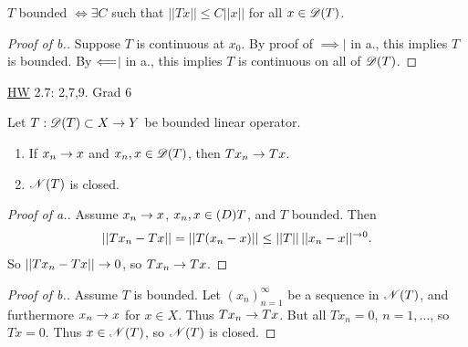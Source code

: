 \documentclass[]{article}
\begin{document}
\begin{recall}
	$T$ bounded $\iff \exists C$ such that $||Tx||\leq C||x||$ for all $x\in\mathscr{D}(T)$.
\end{recall}
\begin{proof}
	[Proof of b.] Suppose $T$ is continuous at $x_0$. By proof of \ul{$\implies$}$\mid$ in a., this implies $T$ is bounded.
	By \ul{$\Longleftarrow$}$\mid$ in a., this implies $T$ is continuous on all of $\mathscr{D}(T)$.
\end{proof}
\ul{HW} 2.7: 2,7,9. Grad 6 
\begin{corollary}
	Let $T:\mathscr{D}(T)\subset X\rightarrow Y$ be bounded linear operator.
	\begin{enumerate}
		\item[a.] If $x_n\rightarrow x$ and $x_n,x\in\mathscr{D}(T)$, then $Tx_n\rightarrow Tx$.
		\item[b.] $\mathscr{N}(T)$ is closed.
	\end{enumerate}
\end{corollary}
\begin{proof}
	[Proof of a.] Assume $x_n\rightarrow x$, $x_n,x\in\mathscr{(}D)T$, and $T$ bounded. Then
	\begin{align*}
		||Tx_n-Tx|| = ||T(x_n-x)||
					\leq ||T||\,||x_n-x||^{\rightarrow0}.
	\end{align*}
	So $||Tx_n-Tx||\rightarrow0$, so $Tx_n\rightarrow Tx$.
\end{proof}
\begin{proof}
	[Proof of b.] Assume $T$ is bounded. Let $(x_n)_{n=1}^\infty$ be a sequence in $\mathscr{N}(T)$, and furthermore $x_n\rightarrow x$ for $x\in X$.
	Thus $Tx_n\rightarrow Tx$. But all $Tx_n=0$, $n=1,\dots$, so $Tx=0$. Thus $x\in\mathscr{N}(T)$, so $\mathscr{N}(T)$ is closed.
\end{proof}
\end{document}
